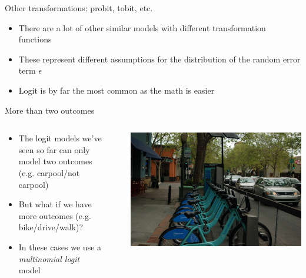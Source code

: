 \begin{frame}{Other transformations: probit, tobit, etc.}
  \begin{itemize}
    \item There are a lot of other similar models with different transformation functions
    \item These represent different assumptions for the distribution of the random error term $\epsilon$
    \item Logit is by far the most common as the math is easier
  \end{itemize}
\end{frame}

\begin{frame}{More than two outcomes}
  \begin{columns}
    \begin{column}{0.65\textwidth}
      \begin{itemize}
        \item The logit models we've seen so far can only model two outcomes (e.g. carpool/not carpool)
        \item But what if we have more outcomes (e.g. bike/drive/walk)?
        \item In these cases we use a \emph{multinomial logit} model
      \end{itemize}
    \end{column}~%
    \begin{column}{0.34\textwidth}
      \includegraphics[width=\textwidth]{img/bikeshare.jpg}
    \end{column}
  \end{columns}
\end{frame}

